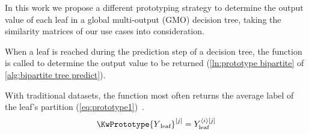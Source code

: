 In this work we propose a different prototyping strategy to determine the output value of each leaf in a global multi-output (GMO) decision tree, taking the similarity matrices of our use cases into consideration.

When a leaf is reached during the prediction step of a decision tree, the \KwPrototype function is called to determine the output value to be returned (\autoref{ln:prototype bipartite} of \autoref{alg:bipartite tree predict}).

\algBipartiteTreePredict

With traditional datasets, the \KwPrototype function
most often returns the average label of the leaf's partition (\autoref{eq:prototype1})~\cite{breiman1984classification}.
%
\begin{equation}
    \KwPrototype{Y\textsubscript{leaf}}\el j=Y_\text{leaf}^{\ang{i}[j]}
    \label{eq:prototype1}
\end{equation}

